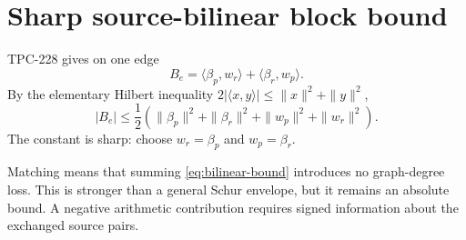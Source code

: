 \section{Sharp source-bilinear block bound}

TPC-228 gives on one edge
\[
 B_e=\langle\beta_p,w_r\rangle+\langle\beta_r,w_p\rangle.
\]
By the elementary Hilbert inequality $2|\langle x,y\rangle|\le
\|x\|^2+\|y\|^2$,
\begin{equation}
 |B_e|\le\frac12\left(
 \|\beta_p\|^2+\|\beta_r\|^2+\|w_p\|^2+\|w_r\|^2
 \right).
 \label{eq:bilinear-bound}
\end{equation}
The constant is sharp: choose $w_r=\beta_p$ and $w_p=\beta_r$.

Matching means that summing \eqref{eq:bilinear-bound} introduces no graph-degree loss.
This is stronger than a general Schur envelope, but it remains an absolute bound.  A
negative arithmetic contribution requires signed information about the exchanged source
pairs.
